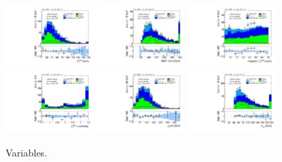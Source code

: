\begin{figure}[!htpb]
  \includegraphics[width=0.30\textwidth]{figures/analysis/vbf-topCR/met-pt-hi}
  \includegraphics[width=0.30\textwidth]{figures/analysis/vbf-topCR/mMMC}
  \includegraphics[width=0.30\textwidth]{figures/analysis/vbf-topCR/mT} \\
  \includegraphics[width=0.30\textwidth]{figures/analysis/vbf-topCR/met-phi-centrality}
  \includegraphics[width=0.30\textwidth]{figures/analysis/vbf-topCR/H-pt-hi}
  \includegraphics[width=0.30\textwidth]{figures/analysis/vbf-topCR/mvis} \\
  \caption{Variables.}
  \label{fig:backgrounds-topCR-taus}
\end{figure}

